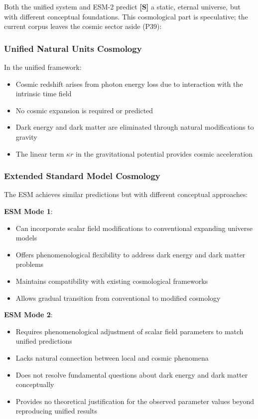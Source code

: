 	Both the unified system and ESM-2 predict \textbf{[S]} a static, eternal universe, but with different conceptual foundations. This cosmological part is speculative; the current corpus leaves the cosmic sector aside (P39):
	
	\subsubsection{Unified Natural Units Cosmology}
	\label{subsubsec:unified_cosmology}
	
	In the unified framework:
	\begin{itemize}
		\item Cosmic redshift arises from photon energy loss due to interaction with the intrinsic time field
		\item No cosmic expansion is required or predicted
		\item Dark energy and dark matter are eliminated through natural modifications to gravity
		\item The linear term $\kappa r$ in the gravitational potential provides cosmic acceleration
	\end{itemize}
	
	\subsubsection{Extended Standard Model Cosmology}
	\label{subsubsec:esm_cosmology}
	
	The ESM achieves similar predictions but with different conceptual approaches:
	
	\textbf{ESM Mode 1}:
	\begin{itemize}
		\item Can incorporate scalar field modifications to conventional expanding universe models
		\item Offers phenomenological flexibility to address dark energy and dark matter problems
		\item Maintains compatibility with existing cosmological frameworks
		\item Allows gradual transition from conventional to modified cosmology
	\end{itemize}
	
	\textbf{ESM Mode 2}:
	\begin{itemize}
		\item Requires phenomenological adjustment of scalar field parameters to match unified predictions
		\item Lacks natural connection between local and cosmic phenomena
		\item Does not resolve fundamental questions about dark energy and dark matter conceptually
		\item Provides no theoretical justification for the observed parameter values beyond reproducing unified results
	\end{itemize}
	
